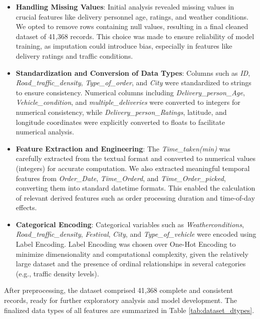 \documentclass[10pt,twocolumn,letterpaper]{article}
\begin{document}
\begin{itemize}
    \item \textbf{Handling Missing Values}: 
    Initial analysis revealed missing values in crucial features like delivery personnel age, ratings, and weather conditions. We opted to remove rows containing null values, resulting in a final cleaned dataset of 41,368 records. This choice was made to ensure reliability of model training, as imputation could introduce bias, especially in features like delivery ratings and traffic conditions.

    \item \textbf{Standardization and Conversion of Data Types}: 
    Columns such as \textit{ID}, \textit{Road\_traffic\_density}, \textit{Type\_of\_order}, and \textit{City} were standardized to strings to ensure consistency. Numerical columns including \textit{Delivery\_person\_Age}, \textit{Vehicle\_condition}, and \textit{multiple\_deliveries} were converted to integers for numerical consistency, while \textit{Delivery\_person\_Ratings}, latitude, and longitude coordinates were explicitly converted to floats to facilitate numerical analysis.

    \item \textbf{Feature Extraction and Engineering}: 
    The \textit{Time\_taken(min)} was carefully extracted from the textual format and converted to numerical values (integers) for accurate computation. We also extracted meaningful temporal features from \textit{Order\_Date}, \textit{Time\_Orderd}, and \textit{Time\_Order\_picked}, converting them into standard datetime formats. This enabled the calculation of relevant derived features such as order processing duration and time-of-day effects.

    \item \textbf{Categorical Encoding}:
    Categorical variables such as \textit{Weatherconditions}, \textit{Road\_traffic\_density}, \textit{Festival}, \textit{City}, and \textit{Type\_of\_vehicle} were encoded using Label Encoding. Label Encoding was chosen over One-Hot Encoding to minimize dimensionality and computational complexity, given the relatively large dataset and the presence of ordinal relationships in several categories (e.g., traffic density levels).
\end{itemize}

After preprocessing, the dataset comprised 41,368 complete and consistent records, ready for further exploratory analysis and model development. The finalized data types of all features are summarized in Table \ref{tab:dataset_dtypes}.
\end{document}
